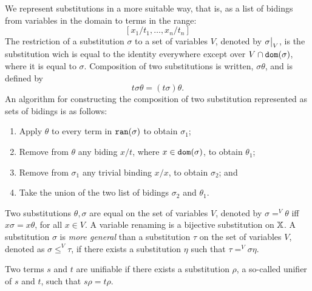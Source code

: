 We represent substitutions in a more suitable way, that is, as a list of bidings from variables in the domain to terms in the range:
$$[x_1 / t_1, \dots, x_n / t_n ]$$
The restriction of a substitution $\sigma$ to a set of variables $V$, denoted by $\restr{\sigma}{V}$, is the substitution wich is equal to the identity everywhere except over $V \cap \mathtt{dom}(\sigma)$, where it is equal to $\sigma$. Composition of two substitutions is written, $\sigma \theta$, and is defined by
$$t\sigma \theta = (t\sigma)\theta.$$
An algorithm for constructing the composition of two substitution represented as sets of bidings is as follows:
\begin{enumerate}
    \item Apply $\theta$ to every term in $\mathtt{ran}(\sigma)$ to obtain $\sigma_1$;
    \item Remove from $\theta$ any biding $x/t$, where $x \in \mathtt{dom}(\sigma)$, to obtain $\theta_1$;
    \item Remove from $\sigma_1$ any trivial binding $x/x$, to obtain $\sigma_2$; and
    \item Take the union of the two list of bidings $\sigma_2$ and $\theta_1$.
\end{enumerate}
Two substitutions $\theta, \sigma$ are equal on the set of variables $V$, denoted by $\sigma =^V \theta$ iff $x \sigma = x \theta$, for all $x \in V$. A variable renaming is a bijective substitution on $\mathbb{X}$. A substitution $\sigma$ is \textit{more general} than a substitution $\tau$ on the set of variables $V$, denoted as $\sigma \leq^V \tau$, if there exists a substitution $\eta$ such that $ \tau =^V \sigma \eta$.

Two terms $s$ and $t$ are unifiable if there exists a substitution $\rho$, a so-called unifier of $s$ and $t$, such that $s \rho = t \rho$.


